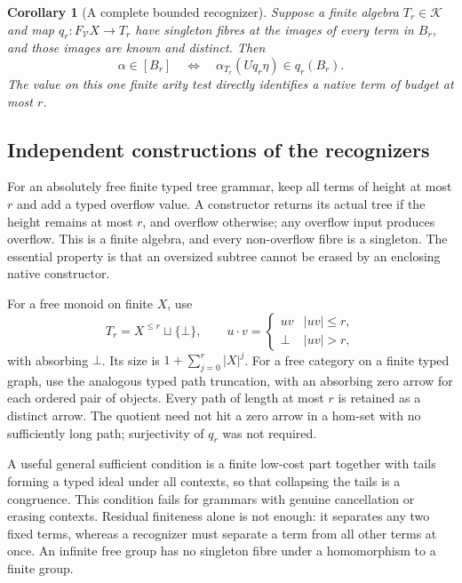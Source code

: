 \documentclass[11pt]{article}
\newtheorem{corollary}[theorem]{Corollary}
\theoremstyle{definition}
\theoremstyle{remark}
\begin{document}
\begin{corollary}[A complete bounded recognizer]\label{alg-cor:budget}
Suppose a finite algebra $T_r\in\mathcal K$ and map $q_r:F_{\mathcal V}X\to T_r$
have singleton fibres at the images of every term in $B_r$, and those
images are known and distinct. Then
\[
 \alpha\in[B_r]
 \quad\Longleftrightarrow\quad
 \alpha_{T_r}(Uq_r\eta)\in q_r(B_r).
\]
The value on this one finite arity test directly identifies a native term
of budget at most $r$.
\end{corollary}

\subsection{Independent constructions of the recognizers}
For an absolutely free finite typed tree grammar, keep all terms of height
at most $r$ and add a typed overflow value. A constructor returns its
actual tree if the height remains at most $r$, and overflow otherwise;
any overflow input produces overflow. This is a finite algebra, and every
non-overflow fibre is a singleton. The essential property is that an
oversized subtree cannot be erased by an enclosing native constructor.

For a free monoid on finite $X$, use
\[
 T_r=X^{\leq r}\sqcup\{\bot\},
 \qquad
 u\cdot v=
 \begin{cases}uv&|uv|\leq r,\\ \bot&|uv|>r,\end{cases}
\]
with absorbing $\bot$. Its size is $1+\sum_{j=0}^r|X|^j$.
For a free category on a finite typed graph, use the analogous typed path
truncation, with an absorbing zero arrow for each ordered pair of objects.
Every path of length at most $r$ is retained as a distinct arrow. The
quotient need not hit a zero arrow in a hom-set with no sufficiently long
path; surjectivity of $q_r$ was not required.

A useful general sufficient condition is a finite low-cost part together
with tails forming a typed ideal under all contexts, so that collapsing
the tails is a congruence. This condition fails for grammars with genuine
cancellation or erasing contexts. Residual finiteness alone is not enough:
it separates any two fixed terms, whereas a recognizer must separate a
term from all other terms at once. An infinite free group has no
singleton fibre under a homomorphism to a finite group.
\end{document}
